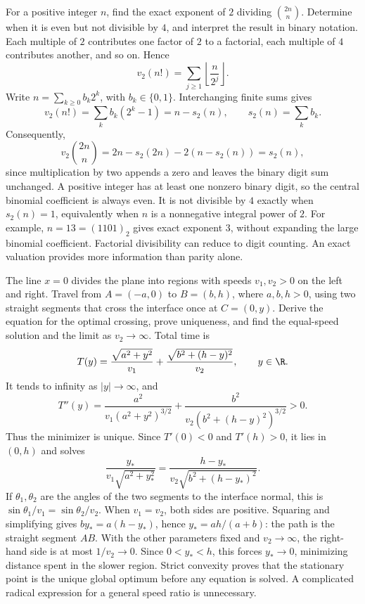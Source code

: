 For a positive integer $n$, find the exact exponent of $2$ dividing $\binom{2n}{n}$. Determine when it is even but not divisible by $4$, and interpret the result in binary notation.
\solution Each multiple of $2$ contributes one factor of $2$ to a factorial, each multiple of $4$ contributes another, and so on. Hence
\[
 v_2(n!)=\sum_{j\ge1}\left\lfloor\frac n{2^j}\right\rfloor.
\]
Write $n=\sum_{k\ge0}b_k2^k$, with $b_k\in\{0,1\}$. Interchanging finite sums gives
\[
 v_2(n!)=\sum_k b_k(2^k-1)=n-s_2(n),
 \qquad s_2(n)=\sum_k b_k.
\]
Consequently,
\[
 v_2\binom{2n}{n}
 =2n-s_2(2n)-2(n-s_2(n))=s_2(n),
\]
since multiplication by two appends a zero and leaves the binary digit sum unchanged. A positive integer has at least one nonzero binary digit, so the central binomial coefficient is always even. It is not divisible by $4$ exactly when $s_2(n)=1$, equivalently when $n$ is a nonnegative integral power of $2$.
For example, $n=13=(1101)_2$ gives exact exponent $3$, without expanding the large binomial coefficient.
\insight Factorial divisibility can reduce to digit counting. An exact valuation provides more information than parity alone.

The line $x=0$ divides the plane into regions with speeds $v_1,v_2>0$ on the left and right. Travel from $A=(-a,0)$ to $B=(b,h)$, where $a,b,h>0$, using two straight segments that cross the interface once at $C=(0,y)$. Derive the equation for the optimal crossing, prove uniqueness, and find the equal-speed solution and the limit as $v_2\to\infty$.
\solution Total time is
\[
 T(y)=\frac{\sqrt{a^2+y^2}}{v_1}
      +\frac{\sqrt{b^2+(h-y)^2}}{v_2},\qquad y\in\R.
\]
It tends to infinity as $|y|\to\infty$, and
\[
 T''(y)=\frac{a^2}{v_1(a^2+y^2)^{3/2}}
 +\frac{b^2}{v_2(b^2+(h-y)^2)^{3/2}}>0.
\]
Thus the minimizer is unique. Since $T'(0)<0$ and $T'(h)>0$, it lies in $(0,h)$ and solves
\[
 \boxed{\frac{y_*}{v_1\sqrt{a^2+y_*^2}}
 =\frac{h-y_*}{v_2\sqrt{b^2+(h-y_*)^2}}}.
\]
If $\theta_1,\theta_2$ are the angles of the two segments to the interface normal, this is $\sin\theta_1/v_1=\sin\theta_2/v_2$.
When $v_1=v_2$, both sides are positive. Squaring and simplifying gives $by_*=a(h-y_*)$, hence $y_*=ah/(a+b)$: the path is the straight segment $AB$. With the other parameters fixed and $v_2\to\infty$, the right-hand side is at most $1/v_2\to0$. Since $0<y_*<h$, this forces $y_*\to0$, minimizing distance spent in the slower region.
\insight Strict convexity proves that the stationary point is the unique global optimum before any equation is solved. A complicated radical expression for a general speed ratio is unnecessary.

